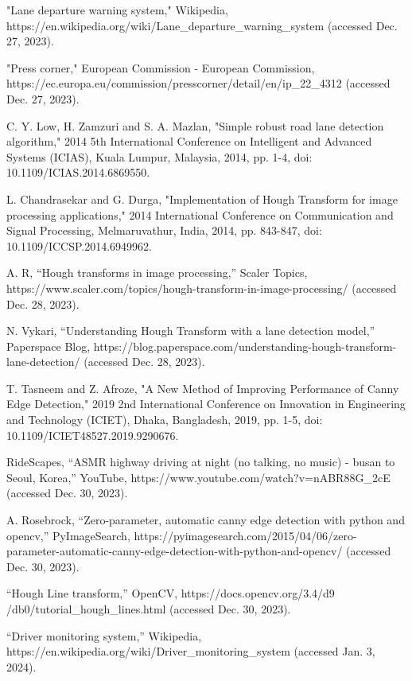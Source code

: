 \documentclass[9pt,conference]{IEEEtran}
\begin{document}
\begin{thebibliography}{00}

     "Lane departure warning system," Wikipedia, https://en.wikipedia.org/wiki/Lane\_departure\_warning\_system (accessed Dec. 27, 2023).

     "Press corner," European Commission - European Commission, https://ec.europa.eu/commission/presscorner/detail/en/ip\_22\_4312 (accessed Dec. 27, 2023).

     C. Y. Low, H. Zamzuri and S. A. Mazlan, "Simple robust road lane detection algorithm," 2014 5th International Conference on Intelligent and Advanced Systems (ICIAS), Kuala Lumpur, Malaysia, 2014, pp. 1-4, doi: 10.1109/ICIAS.2014.6869550.

     L. Chandrasekar and G. Durga, "Implementation of Hough Transform for image processing applications," 2014 International Conference on Communication and Signal Processing, Melmaruvathur, India, 2014, pp. 843-847, doi: 10.1109/ICCSP.2014.6949962.

     A. R, “Hough transforms in image processing,” Scaler Topics, https://www.scaler.com/topics/hough-transform-in-image-processing/ (accessed Dec. 28, 2023).

     N. Vykari, “Understanding Hough Transform with a lane detection model,” Paperspace Blog, https://blog.paperspace.com/understanding-hough-transform-lane-detection/ (accessed Dec. 28, 2023).

     T. Tasneem and Z. Afroze, "A New Method of Improving Performance of Canny Edge Detection," 2019 2nd International Conference on Innovation in Engineering and Technology (ICIET), Dhaka, Bangladesh, 2019, pp. 1-5, doi: 10.1109/ICIET48527.2019.9290676.

     RideScapes, “ASMR highway driving at night (no talking, no music) - busan to Seoul, Korea,” YouTube, https://www.youtube.com/watch?v=nABR88G\_2cE (accessed Dec. 30, 2023).

     A. Rosebrock, “Zero-parameter, automatic canny edge detection with python and opencv,” PyImageSearch, https://pyimagesearch.com/2015/04/06/zero-parameter-automatic-canny-edge-detection-with-python-and-opencv/ (accessed Dec. 30, 2023).

     “Hough Line transform,” OpenCV, https://docs.opencv.org/3.4/d9 /db0/tutorial\_hough\_lines.html (accessed Dec. 30, 2023).

     “Driver monitoring system,” Wikipedia, https://en.wikipedia.org/wiki/Driver\_monitoring\_system (accessed Jan. 3, 2024).


\end{thebibliography}
\end{document}
